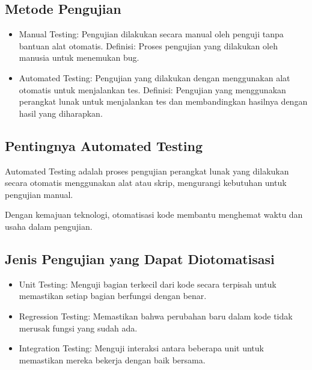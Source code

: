 \documentclass{article}
\begin{document}
\subsection{Metode Pengujian}
\begin{itemize}
    \item Manual Testing: Pengujian dilakukan secara manual oleh penguji tanpa bantuan alat otomatis. Definisi: Proses pengujian yang dilakukan oleh manusia untuk menemukan bug.
    \item Automated Testing: Pengujian yang dilakukan dengan menggunakan alat otomatis untuk menjalankan tes. Definisi: Pengujian yang menggunakan perangkat lunak untuk menjalankan tes dan membandingkan hasilnya dengan hasil yang diharapkan.
\end{itemize}

\subsection{Pentingnya Automated Testing}
Automated Testing adalah proses pengujian perangkat lunak yang dilakukan secara otomatis menggunakan alat atau skrip, mengurangi kebutuhan untuk pengujian manual.

Dengan kemajuan teknologi, otomatisasi kode membantu menghemat waktu dan usaha dalam pengujian.

\subsection{Jenis Pengujian yang Dapat Diotomatisasi}
\begin{itemize}
    \item Unit Testing: Menguji bagian terkecil dari kode secara terpisah untuk memastikan setiap bagian berfungsi dengan benar.
    \item Regression Testing: Memastikan bahwa perubahan baru dalam kode tidak merusak fungsi yang sudah ada.
    \item Integration Testing: Menguji interaksi antara beberapa unit untuk memastikan mereka bekerja dengan baik bersama.
\end{itemize}
\end{document}
